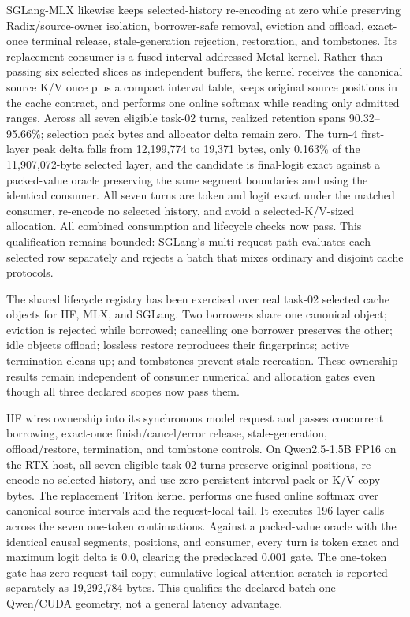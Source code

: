 \documentclass[11pt]{article}
\begin{document}
SGLang-MLX likewise keeps selected-history re-encoding at zero while preserving
Radix/source-owner isolation, borrower-safe removal, eviction and offload,
exact-once terminal release, stale-generation rejection, restoration, and
tombstones.  Its replacement consumer is a fused interval-addressed Metal
kernel.  Rather than passing six selected slices as independent buffers, the
kernel receives the canonical source K/V once plus a compact interval table,
keeps original source positions in the cache contract, and performs one online
softmax while reading only admitted ranges.  Across all seven eligible task-02
turns, realized retention spans 90.32--95.66\%; selection pack bytes and
allocator delta remain zero.  The turn-4 first-layer peak delta falls from
12,199,774 to 19,371 bytes, only 0.163\% of the 11,907,072-byte selected layer,
and the candidate is final-logit exact against a packed-value oracle preserving
the same segment boundaries and using the identical consumer.  All seven turns
are token and logit exact under the matched consumer, re-encode no selected
history, and avoid a selected-K/V-sized allocation.  All combined consumption
and lifecycle checks now pass.  This qualification remains bounded:
SGLang's multi-request path evaluates each selected row separately and rejects a
batch that mixes ordinary and disjoint cache protocols.

The shared lifecycle registry has been exercised over real task-02 selected
cache objects for HF, MLX, and SGLang.  Two borrowers share one canonical
object; eviction is rejected while borrowed; cancelling one borrower preserves
the other; idle objects offload; lossless restore reproduces their fingerprints;
active termination cleans up; and tombstones prevent stale recreation.  These
ownership results remain independent of consumer numerical and allocation
gates even though all three declared scopes now pass them.

HF wires ownership into its synchronous model request and passes concurrent
borrowing, exact-once finish/cancel/error release, stale-generation,
offload/restore, termination, and tombstone controls.  On Qwen2.5-1.5B FP16 on
the RTX host, all seven eligible task-02 turns preserve original positions,
re-encode no selected history, and use zero persistent interval-pack or K/V-copy
bytes.  The replacement Triton kernel performs one fused online softmax over
canonical source intervals and the request-local tail.  It executes 196 layer
calls across the seven one-token continuations.  Against a packed-value oracle
with the identical causal segments, positions, and consumer, every turn is token
exact and maximum logit delta is 0.0, clearing the predeclared 0.001 gate.  The
one-token gate has zero request-tail copy; cumulative logical attention scratch
is reported separately as 19,292,784 bytes.  This qualifies the declared
batch-one Qwen/CUDA geometry, not a general latency advantage.
\end{document}
